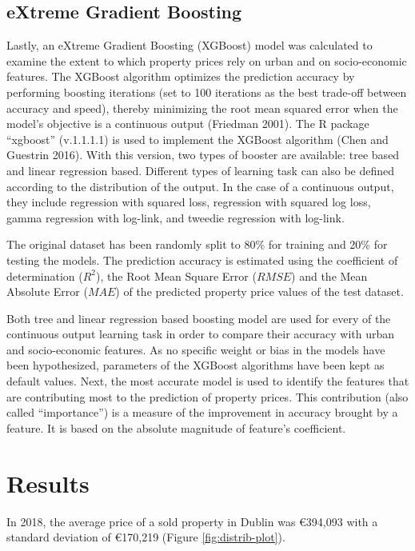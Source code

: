 \documentclass[conference,final,]{IEEEtran}
\begin{document}
\hypertarget{extreme-gradient-boosting}{%
\subsection{eXtreme Gradient Boosting}\label{extreme-gradient-boosting}}

Lastly, an eXtreme Gradient Boosting (XGBoost) model was calculated to examine the extent to which property prices rely on urban and on socio-economic features. The XGBoost algorithm optimizes the prediction accuracy by performing boosting iterations (set to 100 iterations as the best trade-off between accuracy and speed), thereby minimizing the root mean squared error when the model's objective is a continuous output (Friedman 2001). The R package ``xgboost'' (v.1.1.1.1) is used to implement the XGBoost algorithm (Chen and Guestrin 2016). With this version, two types of booster are available: tree based and linear regression based. Different types of learning task can also be defined according to the distribution of the output. In the case of a continuous output, they include regression with squared loss, regression with squared log loss, gamma regression with log-link, and tweedie regression with log-link.

The original dataset has been randomly split to 80\% for training and 20\% for testing the models. The prediction accuracy is estimated using the coefficient of determination (\(R^2\)), the Root Mean Square Error (\(RMSE\)) and the Mean Absolute Error (\(MAE\)) of the predicted property price values of the test dataset.

Both tree and linear regression based boosting model are used for every of the continuous output learning task in order to compare their accuracy with urban and socio-economic features. As no specific weight or bias in the models have been hypothesized, parameters of the XGBoost algorithms have been kept as default values. Next, the most accurate model is used to identify the features that are contributing most to the prediction of property prices. This contribution (also called ``importance'') is a measure of the improvement in accuracy brought by a feature. It is based on the absolute magnitude of feature's coefficient.

\hypertarget{results}{%
\section{Results}\label{results}}

In 2018, the average price of a sold property in Dublin was €394,093 with a standard deviation of €170,219 (Figure \ref{fig:distrib-plot}).
\end{document}
